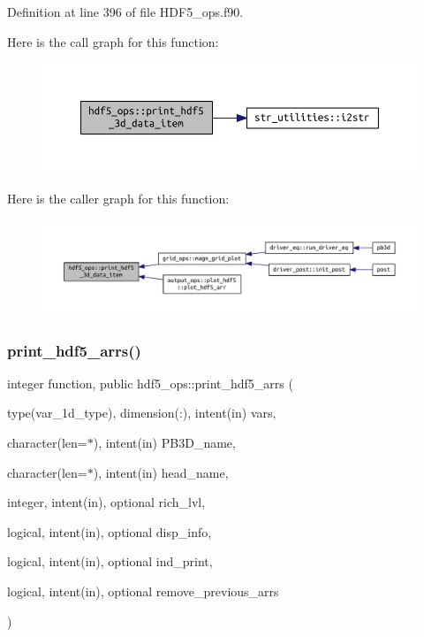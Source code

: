 Definition at line 396 of file H\+D\+F5\+\_\+ops.\+f90.

Here is the call graph for this function\+:\nopagebreak
\begin{figure}[H]
\begin{center}
\leavevmode
\includegraphics[width=350pt]{namespacehdf5__ops_ad794d069ca355f28536fba7e0d21bc13_cgraph}
\end{center}
\end{figure}
Here is the caller graph for this function\+:\nopagebreak
\begin{figure}[H]
\begin{center}
\leavevmode
\includegraphics[width=350pt]{namespacehdf5__ops_ad794d069ca355f28536fba7e0d21bc13_icgraph}
\end{center}
\end{figure}
\mbox{\label{namespacehdf5__ops_af80b879ed614698ed91b8235cf1cb22a}} 
\subsubsection{\texorpdfstring{print\+\_\+hdf5\+\_\+arrs()}{print\_hdf5\_arrs()}}
{\footnotesize\ttfamily integer function, public hdf5\+\_\+ops\+::print\+\_\+hdf5\+\_\+arrs (\begin{DoxyParamCaption}\item[{type(var\+\_\+1d\+\_\+type), dimension(\+:), intent(in)}]{vars,  }\item[{character(len=$\ast$), intent(in)}]{P\+B3\+D\+\_\+name,  }\item[{character(len=$\ast$), intent(in)}]{head\+\_\+name,  }\item[{integer, intent(in), optional}]{rich\+\_\+lvl,  }\item[{logical, intent(in), optional}]{disp\+\_\+info,  }\item[{logical, intent(in), optional}]{ind\+\_\+print,  }\item[{logical, intent(in), optional}]{remove\+\_\+previous\+\_\+arrs }\end{DoxyParamCaption})}



